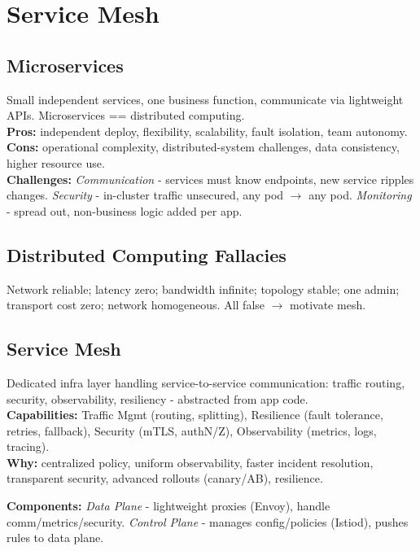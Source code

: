 \renewcommand{\chapcolor}{chMesh}
\section{Service Mesh}
\subsection{Microservices}
Small independent services, one business function, communicate via lightweight APIs. Microservices == distributed computing. \\
\textbf{Pros:} independent deploy, flexibility, scalability, fault isolation, team autonomy. \\
\textbf{Cons:} operational complexity, distributed-system challenges, data consistency, higher resource use. \\
\textbf{Challenges:} \textit{Communication} - services must know endpoints, new service ripples changes. \textit{Security} - in-cluster traffic unsecured, any pod $\to$ any pod. \textit{Monitoring} - spread out, non-business logic added per app.

\subsection{Distributed Computing Fallacies}
Network reliable; latency zero; bandwidth infinite; topology stable; one admin; transport cost zero; network homogeneous. All false $\to$ motivate mesh.

\subsection{Service Mesh}
Dedicated infra layer handling service-to-service communication: traffic routing, security, observability, resiliency - abstracted from app code. \\
\textbf{Capabilities:} Traffic Mgmt (routing, splitting), Resilience (fault tolerance, retries, fallback), Security (mTLS, authN/Z), Observability (metrics, logs, tracing). \\
\textbf{Why:} centralized policy, uniform observability, faster incident resolution, transparent security, advanced rollouts (canary/AB), resilience.

\textbf{Components:} \textit{Data Plane} - lightweight proxies (Envoy), handle comm/metrics/security. \textit{Control Plane} - manages config/policies (Istiod), pushes rules to data plane.

